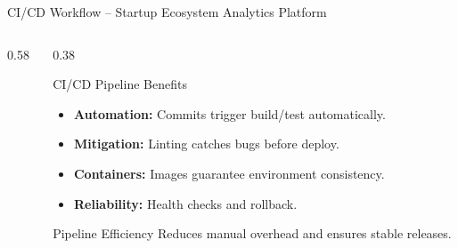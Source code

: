 \documentclass[aspectratio=169, 10pt]{beamer}
\begin{document}
\begin{frame}{CI/CD Workflow -- Startup Ecosystem Analytics Platform}
\begin{columns}[T]
\begin{column}{0.58\textwidth}
{
      }
    \end{column}
    \begin{column}{0.38\textwidth}
      \begin{scard}{CI/CD Pipeline Benefits}
        \begin{itemize}\setlength{\itemsep}{0pt}
          \item \textbf{Automation:} Commits trigger build/test automatically.
          \item \textbf{Mitigation:} Linting catches bugs before deploy.
          \item \textbf{Containers:} Images guarantee environment consistency.
          \item \textbf{Reliability:} Health checks and rollback.
        \end{itemize}
      \end{scard}
      \vspace{0.5mm}
      \begin{successbox}{Pipeline Efficiency}
        Reduces manual overhead and ensures stable releases.
      \end{successbox}
    \end{column}
  \end{columns}
\end{frame}
\end{document}
